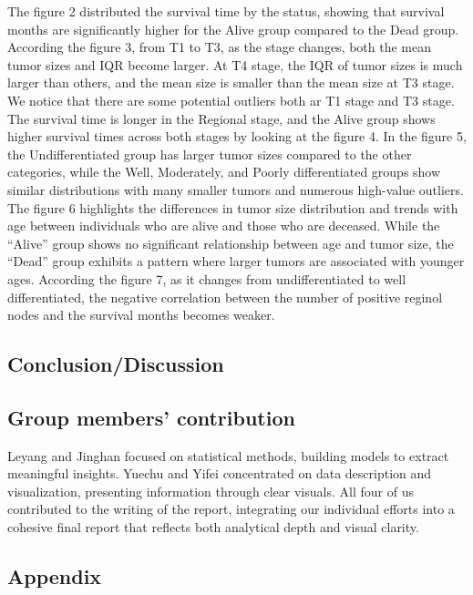 \documentclass[
]{article}
\begin{document}
The figure 2 distributed the survival time by the status, showing that
survival months are significantly higher for the Alive group compared to
the Dead group. According the figure 3, from T1 to T3, as the stage
changes, both the mean tumor sizes and IQR become larger. At T4 stage,
the IQR of tumor sizes is much larger than others, and the mean size is
smaller than the mean size at T3 stage. We notice that there are some
potential outliers both ar T1 stage and T3 stage. The survival time is
longer in the Regional stage, and the Alive group shows higher survival
times across both stages by looking at the figure 4. In the figure 5,
the Undifferentiated group has larger tumor sizes compared to the other
categories, while the Well, Moderately, and Poorly differentiated groups
show similar distributions with many smaller tumors and numerous
high-value outliers. The figure 6 highlights the differences in tumor
size distribution and trends with age between individuals who are alive
and those who are deceased. While the ``Alive'' group shows no
significant relationship between age and tumor size, the ``Dead'' group
exhibits a pattern where larger tumors are associated with younger ages.
According the figure 7, as it changes from undifferentiated to well
differentiated, the negative correlation between the number of positive
reginol nodes and the survival months becomes weaker.

\subsection{Conclusion/Discussion}\label{conclusiondiscussion}

\subsection{Group members'
contribution}\label{group-members-contribution}

Leyang and Jinghan focused on statistical methods, building models to
extract meaningful insights. Yuechu and Yifei concentrated on data
description and visualization, presenting information through clear
visuals. All four of us contributed to the writing of the report,
integrating our individual efforts into a cohesive final report that
reflects both analytical depth and visual clarity.

\subsection{Appendix}\label{appendix}
\end{document}
